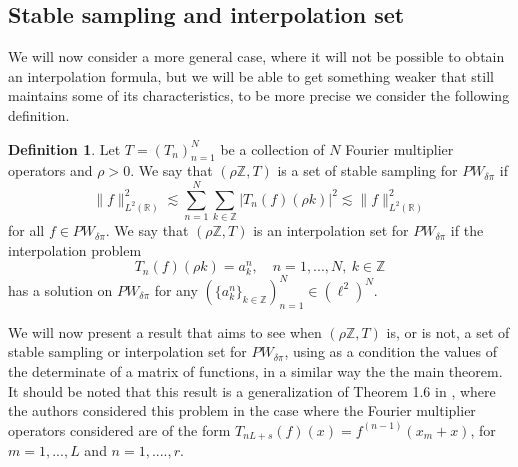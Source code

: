 \documentclass[reqno]{amsart}
\theoremstyle{plain}
\theoremstyle{definition}
\newtheorem{definition}[theorem]{Definition}
\numberwithin{equation}{section}
\newcommand{\Z}{{\mathbb Z}}
\newcommand{\R}{{\mathbb R}}
\newcommand{\pa}[1]{\left(#1\right)}
\newcommand{\abs}[1]{\left\vert#1\right\vert}
\providecommand{\abs}[1]{ \lvert#1  \rvert}
\providecommand{\norm}[1]{ \lVert#1  \rVert}
\begin{document}
\subsection{Stable sampling and interpolation set}

We will now consider a more general case, where it will not be possible to obtain an interpolation formula, but we will be able to get something weaker that still maintains some of its characteristics, to be more precise we consider the following definition. 

\begin{definition}
	Let $T=\pa{T_n}_{n=1}^N$ be a collection of $N$ Fourier multiplier operators and $\rho>0$. We say that $\pa{\rho\Z,T}$ is a set of stable sampling for $PW_{\delta\pi}$ if
	$$\norm{f}_{L^2(\R)}^2 \lesssim \sum_{n=1}^N \sum_{k\in\Z} \abs{T_n(f)(\rho k)}^2 \lesssim \norm{f}_{L^2(\R)}^2$$
	for all $f\in PW_{\delta\pi}$. We say that $\pa{\rho\Z,T}$ is an interpolation set for $PW_{\delta\pi}$ if the interpolation problem
	$$T_n(f)(\rho k)=a^n_k, \quad n=1,...,N, \ k\in\Z$$
	has a solution on $PW_{\delta\pi}$ for any $(\{a^n_k\}_{k\in\Z})_{n=1}^N\in \pa{\ell^2}^N$.
\end{definition}

We will now present a result that aims to see when $(\rho\Z,T)$ is, or is not, a set of stable sampling or interpolation set for $PW_{\delta\pi}$, using as a condition the values of the determinate of a matrix of functions, in a similar way the the main theorem. It should be noted that this result is a generalization of Theorem 1.6 in \cite{GS}, where the authors considered this problem in the case where the Fourier multiplier operators considered are of the form $T_{nL+s}(f)(x)=f^{(n-1)}(x_m+x)$, for $m=1,...,L$ and $n=1,....,r$.
\end{document}
